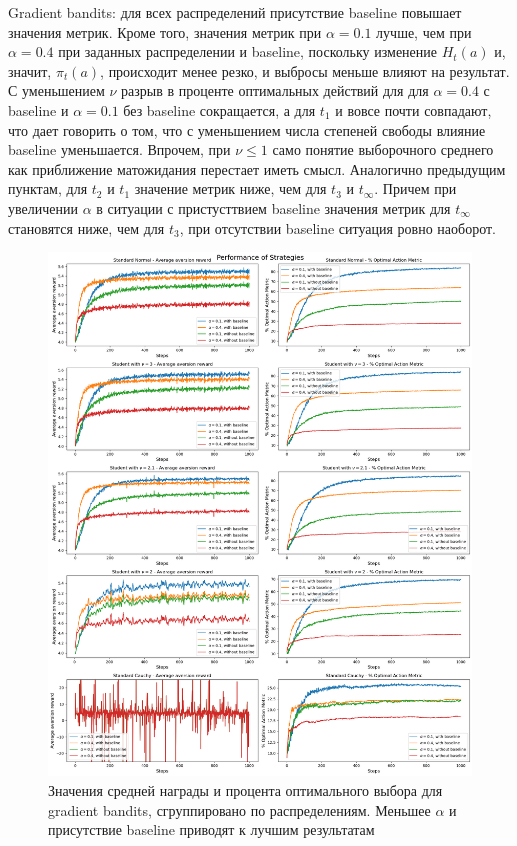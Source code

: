 Gradient bandits: для всех распределений присутствие baseline повышает значения метрик. Кроме того, значения метрик при $\alpha=0.1$ лучше, чем при $\alpha=0.4$ при заданных распределении и baseline, поскольку изменение $H_t(a)$ и, значит, $\pi_t(a)$, происходит менее резко, и выбросы меньше влияют на результат. С уменьшением $\nu$ разрыв в проценте оптимальных действий для для $\alpha=0.4$ с baseline и $\alpha=0.1$ без baseline сокращается, а для $t_1$ и вовсе почти совпадают, что дает говорить о том, что с уменьшением числа степеней свободы влияние baseline уменьшается. Впрочем, при $\nu \leq 1$ само понятие выборочного среднего как приближение матожидания перестает иметь смысл. Аналогично предыдущим пунктам, для $t_2$ и $t_1$ значение метрик ниже, чем для $t_3$ и $t_{\infty}$. Причем при увеличении $\alpha$ в ситуации с пристусттвием baseline значения метрик для $t_{\infty}$ становятся ниже, чем для $t_3$, при отсутствии baseline ситуация ровно наоборот.
\begin{figure}[ht!]
    \centering
    \includegraphics[width=1.1\linewidth]{Figures/experiments_classic/gradient_bandits/first.png}
    \caption{\label{fig:gradient_1}Значения средней награды и процента оптимального выбора для gradient bandits, сгруппировано по распределениям. Меньшее $\alpha$ и присутствие baseline приводят к лучшим результатам}
\end{figure}
